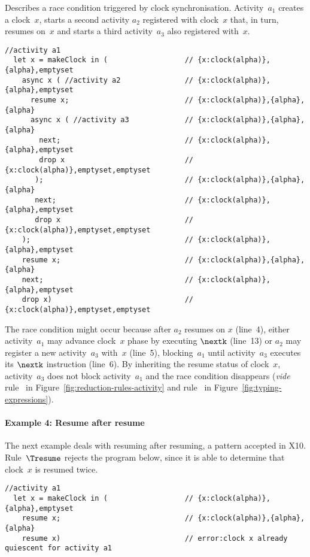 Describes a race condition triggered by clock synchronisation.
Activity~$a_1$ creates a clock~$x$, starts a second activity $a_2$
registered with clock~$x$ that, in turn, resumes on~$x$ and starts a
third activity~$a_3$ also registered with~$x$.
\begin{lstlisting}[numbers=right]
  //activity a1
  let x = makeClock in (                  // {x:clock(alpha)},{alpha},emptyset 
    async x ( //activity a2               // {x:clock(alpha)},{alpha},emptyset
      resume x;                           // {x:clock(alpha)},{alpha},{alpha}
      async x ( //activity a3             // {x:clock(alpha)},{alpha},{alpha}
        next;                             // {x:clock(alpha)},{alpha},emptyset
        drop x                            // {x:clock(alpha)},emptyset,emptyset
       );                                 // {x:clock(alpha)},{alpha},{alpha}
       next;                              // {x:clock(alpha)},{alpha},emptyset
       drop x                             // {x:clock(alpha)},emptyset,emptyset
    );                                    // {x:clock(alpha)},{alpha},emptyset
    resume x;                             // {x:clock(alpha)},{alpha},{alpha}
    next;                                 // {x:clock(alpha)},{alpha},emptyset
    drop x)                               // {x:clock(alpha)},emptyset,emptyset
\end{lstlisting}
The race condition might occur because after $a_2$ resumes on $x$
(line~4), either activity~$a_1$ may advance clock~$x$ phase by executing
$\nextk$ (line~13) or $a_2$ may register a new activity~$a_3$
with~$x$ (line~5), blocking~$a_1$ until activity~$a_3$ executes
its $\nextk$ instruction (line~6).
By inheriting the resume status of clock~$x$, activity~$a_3$ does not
block activity~$a_1$ and the race condition disappears (\textit{vide}
rule~\Rasync{} in Figure~\ref{fig:reduction-rules-activity} and
rule~\Tasync{} in Figure~\ref{fig:typing-expressions}). 

\paragraph{Example 4: Resume after resume}

The next example deals with resuming after resuming, a pattern
accepted in X10. Rule~$\Tresume$ rejects the program below, since it
is able to determine that clock~$x$ is resumed twice.
\begin{lstlisting}[numbers=right]
  //activity a1
  let x = makeClock in (                  // {x:clock(alpha)},{alpha},emptyset
    resume x;                             // {x:clock(alpha)},{alpha},{alpha}
    resume x)                             // error:clock x already quiescent for activity a1
\end{lstlisting} 


